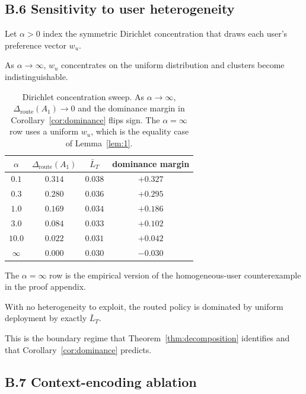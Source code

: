 \documentclass{article} %
\begin{document}
\subsection{B.6 Sensitivity to user heterogeneity}

\label{app:dirichlet-sweep}

Let $\alpha>0$ index the symmetric Dirichlet concentration that draws each user's preference vector $w_u$.

As $\alpha\to\infty$, $w_u$ concentrates on the uniform distribution and clusters become indistinguishable.

\begin{table}[h]
\centering
\small
\begin{tabular}{cccc}
\toprule
$\alpha$ & $\Delta_{\mathrm{route}}(A_1)$ & $\bar{L}_T$ & dominance margin \\
\midrule
$0.1$  & $0.314$ & $0.038$ & $+0.327$ \\
$0.3$  & $0.280$ & $0.036$ & $+0.295$ \\
$1.0$  & $0.169$ & $0.034$ & $+0.186$ \\
$3.0$  & $0.084$ & $0.033$ & $+0.102$ \\
$10.0$ & $0.022$ & $0.031$ & $+0.042$ \\
$\infty$ & $0.000$ & $0.030$ & $-0.030$ \\
\bottomrule
\end{tabular}
\caption{Dirichlet concentration sweep. As $\alpha\to\infty$, $\Delta_{\mathrm{route}}(A_1)\to 0$ and the dominance margin in Corollary~\ref{cor:dominance} flips sign. The $\alpha=\infty$ row uses a uniform $w_u$, which is the equality case of Lemma~\ref{lem:1}.}
\label{tab:app-dirichlet}
\end{table}

The $\alpha=\infty$ row is the empirical version of the homogeneous-user counterexample in the proof appendix.

With no heterogeneity to exploit, the routed policy is dominated by uniform deployment by exactly $\bar{L}_T$.

This is the boundary regime that Theorem~\ref{thm:decomposition} identifies and that Corollary~\ref{cor:dominance} predicts.

\subsection{B.7 Context-encoding ablation}

\label{app:ctx-type}
\end{document}
